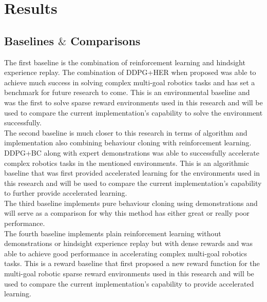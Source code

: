 \section{Results}

\subsection{Baselines $\&$ Comparisons}

The first baseline is the combination of reinforcement learning and hindsight experience replay. The combination of DDPG+HER when proposed was able to achieve much success in solving complex multi-goal robotics tasks and has set a benchmark for future research to come. This is an environmental baseline and was the first to solve sparse reward environments used in this research and will be used to compare the current implementation's capability to solve the environment successfully. \\

The second baseline is much closer to this research in terms of algorithm and implementation also combining behaviour cloning with reinforcement learning. DDPG+BC along with expert demonstrations was able to successfully accelerate complex robotics tasks in the mentioned environments. This is an algorithmic baseline that was first provided accelerated learning for the environments used in this research and will be used to compare the current implementation's capability to further provide accelerated learning. \\

The third baseline implements pure behaviour cloning using demonstrations and will serve as a comparison for why this method has either great or really poor performance. \\

The fourth baseline implements plain reinforcement learning without demonstrations or hindsight experience replay but with dense rewards and was able to achieve good performance in accelerating complex multi-goal robotics tasks. This is a reward baseline that first proposed a new reward function for the multi-goal robotic sparse reward environments used in this research and will be used to compare the current implementation's capability to provide accelerated learning. \\

